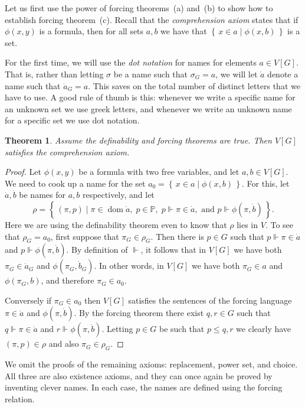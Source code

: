 \documentclass[11pt,oneside]{amsbook}
\newcommand{\set}[1]{\left\{\,#1\,\right\}}
\newcommand{\forces}{\Vdash}
\DeclareMathOperator{\dom}{dom}
\theoremstyle{definition}
\theoremstyle{plain}
\newtheorem{theorem}{Theorem}[section]
\theoremstyle{definition}
\theoremstyle{remark}
\numberwithin{equation}{section}
\numberwithin{figure}{section}
\begin{document}
Let us first use the power of forcing theorems~(a) and~(b) to show how to establish forcing theorem~(c). Recall that the \emph{comprehension axiom} states that if $\phi(x,y)$ is a formula, then for all sets $a,b$ we have that $\set{x\in a\mid\phi(x,b)}$ is a set.

For the first time, we will use the \emph{dot notation} for names for elements $a\in V[G]$. That is, rather than letting $\sigma$ be a name such that $\sigma_G=a$, we will let $\dot a$ denote a name such that $\dot a_G=a$. This saves on the total number of distinct letters that we have to use. A good rule of thumb is this: whenever we write a specific name for an unknown set we use greek letters, and whenever we write an unknown name for a specific set we use dot notation.

\begin{theorem}
  Assume the definability and forcing theorems are true. Then $V[G]$ satisfies the comprehension axiom.
\end{theorem}

\begin{proof}
  Let $\phi(x,y)$ be a formula with two free variables, and let $a,b\in V[G]$. We need to cook up a name for the set $a_0=\set{x\in a\mid\phi(x,b)}$. For this, let $\dot a,\dot b$ be names for $a,b$ respectively, and let
  \[\rho=\set{(\pi,p)\mid\pi\in\dom\dot a,\;p\in\mathbb P,\;p\forces\pi\in\dot a,\text{ and }p\forces\phi(\pi,\dot b)}\text{.}
  \]
  Here we are using the definability theorem even to know that $\rho$ lies in $V$. To see that $\rho_G=a_0$, first suppose that $\pi_G\in\rho_G$. Then there is $p\in G$ such that $p\forces\pi\in\dot a$ and $p\forces\phi(\pi,\dot b)$. By definition of $\forces$, it follows that in $V[G]$ we have both $\pi_G\in\dot a_G$ and $\phi(\pi_G,\dot b_G)$. In other words, in $V[G]$ we have both $\pi_G\in a$ and $\phi(\pi_G,b)$, and therefore $\pi_G\in a_0$.

  Conversely if $\pi_G\in a_0$ then $V[G]$ satisfies the sentences of the forcing language $\pi\in\dot a$ and $\phi(\pi,\dot b)$. By the forcing theorem there exist $q,r\in G$ such that $q\forces\pi\in\dot a$ and $r\forces\phi(\pi,\dot b)$. Letting $p\in G$ be such that $p\leq q,r$ we clearly have $(\pi,p)\in\rho$ and also $\pi_G\in\rho_G$.
\end{proof}

We omit the proofs of the remaining axioms: replacement, power set, and choice. All three are also existence axioms, and they can once again be proved by inventing clever names. In each case, the names are defined using the forcing relation.
\end{document}
